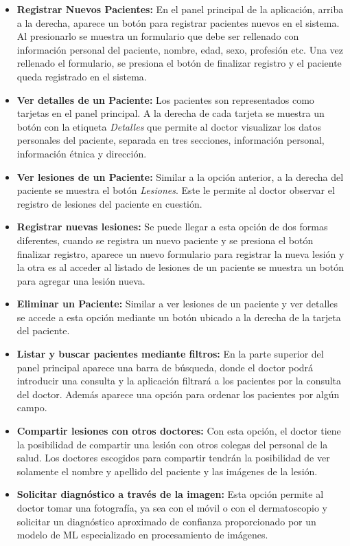 \begin{itemize}
    \item \textbf{Registrar Nuevos Pacientes:} En el panel principal de la aplicaci\'on, arriba a la derecha, aparece un bot\'on para registrar pacientes nuevos en el sistema. Al presionarlo se muestra un formulario que debe ser rellenado con informaci\'on personal del paciente, nombre, edad, sexo, profesi\'on etc. Una vez rellenado el formulario, se presiona el bot\'on de finalizar registro y el paciente queda registrado en el sistema. 
    \item \textbf{Ver detalles de un Paciente:} Los pacientes son representados como tarjetas en el panel principal. A la derecha de cada tarjeta se muestra un bot\'on con la etiqueta \textit{Detalles} que permite al doctor visualizar los datos personales del paciente, separada en tres secciones, informaci\'on personal, informaci\'on \'etnica y direcci\'on.
    \item \textbf{Ver lesiones de un Paciente:} Similar a la opci\'on anterior, a la derecha del paciente se muestra el bot\'on \textit{Lesiones}. Este le permite al doctor observar el registro de lesiones del paciente en cuesti\'on.
    \item \textbf{Registrar nuevas lesiones:} Se puede llegar a esta opci\'on de dos formas diferentes, cuando se registra un nuevo paciente y se presiona el bot\'on finalizar registro, aparece un nuevo formulario para registrar la nueva lesi\'on y la otra es al acceder al listado de lesiones de un paciente se muestra un bot\'on para agregar una lesi\'on nueva. 
    \item \textbf{Eliminar un Paciente:} Similar a ver lesiones de un paciente y ver detalles se accede a esta opci\'on mediante un bot\'on ubicado a la derecha de la tarjeta del paciente.
    \item \textbf{Listar y buscar pacientes mediante filtros:} En la parte superior del panel principal aparece una barra de b\'usqueda, donde el doctor podr\'a introducir una consulta y la aplicaci\'on filtrar\'a a los pacientes por la consulta del doctor. Adem\'as aparece una opci\'on para ordenar los pacientes por alg\'un campo.
    \item \textbf{Compartir lesiones con otros doctores:} Con esta opci\'on, el doctor tiene la posibilidad de compartir una lesi\'on con otros colegas del personal de la salud. Los doctores escogidos para compartir tendr\'an la posibilidad de ver solamente el nombre y apellido del paciente y las im\'agenes de la lesi\'on.
    \item \textbf{Solicitar diagn\'ostico a trav\'es de la imagen:} Esta opci\'on permite al doctor tomar una fotograf\'ia, ya sea con el m\'ovil o con el dermatoscopio y solicitar un diagn\'ostico aproximado de confianza proporcionado por un modelo de ML especializado en procesamiento de im\'agenes.
\end{itemize}

